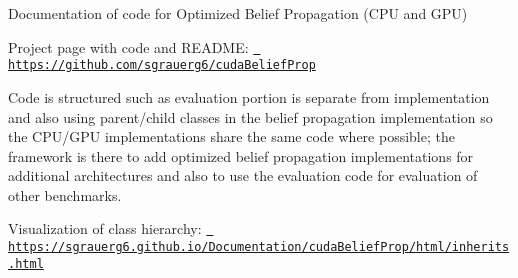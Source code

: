 \label{index_md_src_main}%
%
 Documentation of code for Optimized Belief Propagation (CPU and GPU)

Project page with code and README\+: \href{https://github.com/sgrauerg6/cudaBeliefProp}{\texttt{ https\+://github.\+com/sgrauerg6/cuda\+Belief\+Prop}}

Code is structured such as evaluation portion is separate from implementation and also using parent/child classes in the belief propagation implementation so the CPU/\+GPU implementations share the same code where possible; the framework is there to add optimized belief propagation implementations for additional architectures and also to use the evaluation code for evaluation of other benchmarks.

Visualization of class hierarchy\+: \href{https://sgrauerg6.github.io/Documentation/cudaBeliefProp/html/inherits.html}{\texttt{ https\+://sgrauerg6.\+github.\+io/\+Documentation/cuda\+Belief\+Prop/html/inherits.\+html}} 